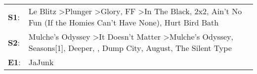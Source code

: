 \begin{supertabular}{p{0.03\textwidth}p{0.92\textwidth}}
 \textbf{S1}:  &                       Le Blitz\textsuperscript{} \textgreater \enspace Plunger\textsuperscript{} \textgreater \enspace Glory\textsuperscript{}, \enspace FF\textsuperscript{} \textgreater \enspace In The Black\textsuperscript{}, \enspace 2x2\textsuperscript{}, \enspace Ain't No Fun (If the Homies Can't Have None)\textsuperscript{}, \enspace Hurt Bird Bath\textsuperscript{}  \enspace  \\
 \textbf{S2}:  &  Mulche's Odyssey\textsuperscript{} \textgreater \enspace It Doesn't Matter\textsuperscript{} \textgreater \enspace Mulche's Odyssey\textsuperscript{}, \enspace Seasons[1]\textsuperscript{}, \enspace Deeper\textsuperscript{}, \textsuperscript{}, \enspace Dump City\textsuperscript{}, \enspace August\textsuperscript{}, \enspace The Silent Type\textsuperscript{}  \enspace  \\
 \textbf{E1}:  &                                                                                                                                                                                                                                                                                                                                                               JaJunk\textsuperscript{}  \enspace  \\
\end{supertabular}
